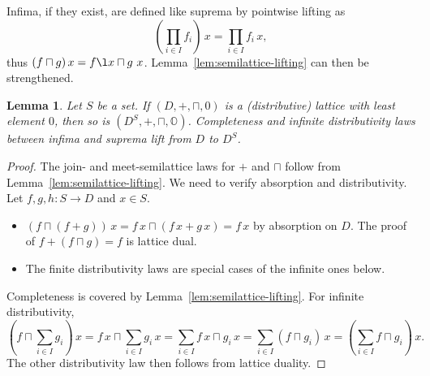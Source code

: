 \documentclass[12pt]{article}
\newtheorem{lemma}{Lemma}
\theoremstyle{definition}
\newcommand{\reflem}[1]{Lem\-ma~\ref{#1}}
\newcommand{\zero}{\mathbb{O}}
\begin{document}
Infima, if they exist, are defined like suprema by pointwise lifting as
\begin{equation*}
  (\prod_{i\in I}f_i)\, x = \prod_{i\in I}f_i\, x,
\end{equation*}
thus $(f\sqcap g)\, x = f\l x\sqcap g\
x$. \reflem{lem:semilattice-lifting} can then be strengthened.
\begin{lemma}\label{lem:lattice-lifting}
  Let $S$ be a set. If $(D,+,\sqcap,0)$ is a (distributive) lattice with
  least element $0$, then so is $(D^S,+,\sqcap,\zero)$. Completeness and infinite distributivity laws between infima and suprema lift from $D$ to $D^S$.
\end{lemma}
\begin{proof}
  The join- and meet-semilattice laws for $+$ and $\sqcap$ follow from
  Lemma~\ref{lem:semilattice-lifting}. We need to verify absorption
  and distributivity. Let $f,g,h:S\to D$ and $x \in S$.
  \begin{itemize}
  \item $(f\sqcap (f+g))\, x = f\, x \sqcap (f\, x + g\, x) = f\, x$ by
    absorption on $D$. The proof of $f+(f\sqcap
    g)=f$ is lattice dual.
  \item The finite distributivity laws are special cases of the
    infinite ones below.
  \end{itemize}
  Completeness is covered by \reflem{lem:semilattice-lifting}. For
  infinite distributivity,
\begin{equation*}
  (f\sqcap \sum_{i\in I} g_i)\, x = f\, x \sqcap \sum_{i\in I}
  g_i\, x = \sum_{i\in I} f\, x \sqcap g_i\, x = \sum_{i\in I} (f\sqcap
  g_i)\, x = (\sum_{i\in I} f\sqcap g_i)\, x.
\end{equation*} 
The other distributivity law then follows from lattice duality.
\end{proof}
\end{document}
